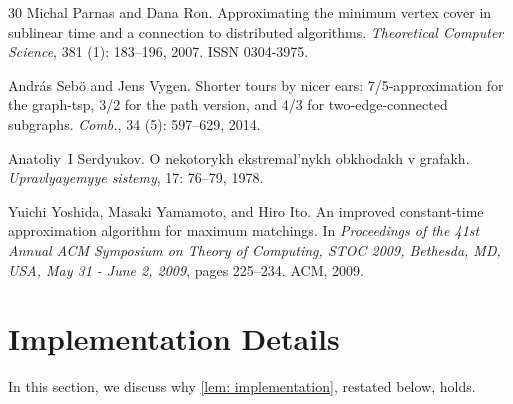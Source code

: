 \documentclass[letterpaper,11pt]{article}
\begin{document}
\begin{thebibliography}{30}
Michal Parnas and Dana Ron.
\newblock Approximating the minimum vertex cover in sublinear time and a
  connection to distributed algorithms.
\newblock \emph{Theoretical Computer Science}, 381 (1):
  183--196, 2007.
\newblock ISSN 0304-3975.

Andr{\'{a}}s Seb{\"{o}} and Jens Vygen.
\newblock Shorter tours by nicer ears: 7/5-approximation for the graph-tsp, 3/2
  for the path version, and 4/3 for two-edge-connected subgraphs.
\newblock \emph{Comb.}, 34 (5): 597--629, 2014.

Anatoliy~I Serdyukov.
\newblock O nekotorykh ekstremal’nykh obkhodakh v grafakh.
\newblock \emph{Upravlyayemyye sistemy}, 17: 76--79, 1978.

Yuichi Yoshida, Masaki Yamamoto, and Hiro Ito.
\newblock An improved constant-time approximation algorithm for maximum
  matchings.
\newblock In \emph{Proceedings of the 41st Annual {ACM} Symposium on Theory of
  Computing, {STOC} 2009, Bethesda, MD, USA, May 31 - June 2, 2009}, pages
  225--234. {ACM}, 2009.

\end{thebibliography}

\appendix

\section{Implementation Details}\label{sec:implementation}

In this section, we discuss why \cref{lem: implementation}, restated below, holds.

\oracleImplementation*
\end{document}
